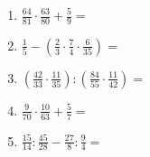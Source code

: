 \begin{Exercise}[title={Berechne die folgenden Ausdrücke und kürze soweit wie möglich}, label=bruecheA1]
\begin{minipage}{\textwidth}
\begin{minipage}{0.5\textwidth}
\begin{enumerate}[label=\alph*)]
				\item \(\frac{64}{81}\cdot\frac{63}{80}+\frac{5}{9}=\)
				\item \(\frac{1}{5}-\left( \frac{2}{3}\cdot \frac{7}{4}\cdot \frac{6}{35}\right) =\)
				\item \(\left( \frac{42}{33}\cdot\frac{11}{35}\right):\left(\frac{84}{55}\cdot\frac{11}{42}\right)  =\)
				\item \(\frac{9}{70}\cdot\frac{10}{63}+\frac{5}{7}=\)
				\item \(\frac{15}{14}:\frac{45}{28}-\frac{27}{8}:\frac{9}{4}=\)
			\end{enumerate}
		\end{minipage}%
	\end{minipage}%
\end{Exercise}
\newpage
\begin{Answer}[ref=bruecheA1]


\end{Answer}
